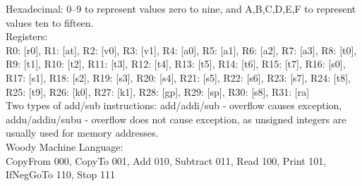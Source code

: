 \documentclass{article}
\begin{document}
  Hexadecimal: 0–9 to represent values zero to nine, and A,B,C,D,E,F to
  represent values ten to fifteen.\\
  Registers: \\
  R0: [r0], R1:  [at], R2:  [v0], R3:  [v1], R4:  [a0], R5:  [a1], R6:  [a2],
  R7:  [a3], R8:  [t0], R9:  [t1], R10: [t2], R11: [t3], R12: [t4], R13: [t5],
  R14: [t6], R15: [t7], R16: [s0], R17: [s1], R18: [s2], R19: [s3], R20: [s4],
  R21: [s5], R22: [s6], R23: [s7], R24: [t8], R25: [t9], R26: [k0], R27: [k1],
  R28: [gp], R29: [sp], R30: [s8], R31: [ra] \\
  Two types of add/sub instructions: 
  add/addi/sub - overflow causes exception,
  addu/addiu/subu - overflow does not cause exception, as unsigned integers are
  usually used for memory addresses. \\ 
  Woody Machine Language: \\
  CopyFrom 000,
  CopyTo 001,
  Add 010,
  Subtract 011,
  Read 100,
  Print 101,
  IfNegGoTo 110,
  Stop 111 \\
\end{document}
